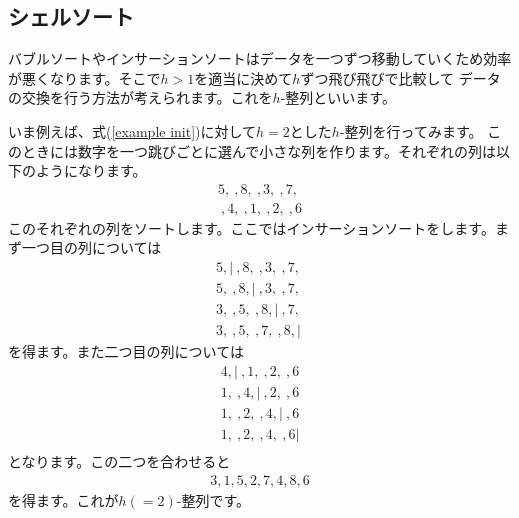 \documentclass[dvipdfmx,pic,eepic,ecltree]{jarticle}
\begin{document}
\subsection{シェルソート}
バブルソートやインサーションソートはデータを一つずつ移動していくため効率が悪くなります。そこで$h>1$を適当に決めて$h$ずつ飛び飛びで比較して
データの交換を行う方法が考えられます。これを$h$-整列といいます。

いま例えば、式(\ref{example init})に対して$h=2$とした$h$-整列を行ってみます。
このときには数字を一つ跳びごとに選んで小さな列を作ります。それぞれの列は以下のようになります。
\begin{eqnarray}
5, ~,  8, ~, 3, ~, 7, ~\\
~, 4,  ~, 1, ~, 2, ~, 6
\end{eqnarray}
このそれぞれの列をソートします。ここではインサーションソートをします。まず一つ目の列については
\begin{eqnarray}
5,| ~,  8, ~, 3, ~, 7, ~\\
5, ~,  8,| ~, 3, ~, 7, ~\\
3, ~,  5, ~,  8,| ~, 7, ~\\
3, ~,  5, ~,  7, ~, 8,| ~
\end{eqnarray}
を得ます。また二つ目の列については
\begin{eqnarray}
 4,|  ~, 1, ~, 2, ~, 6\\
 1,  ~, 4,| ~, 2, ~, 6\\
 1,  ~, 2, ~, 4,| ~, 6\\
 1,  ~, 2, ~, 4, ~, 6|\\
\end{eqnarray}
となります。この二つを合わせると
\begin{eqnarray}
3, 1, 5,  2, 7, 4, 8, 6 
\end{eqnarray}
を得ます。これが$h(=2)$-整列です。
\end{document}
